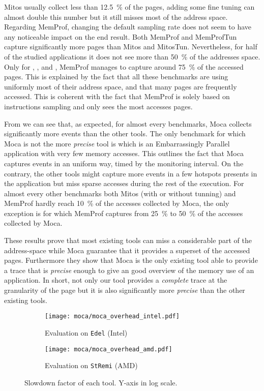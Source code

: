 \gls{Mitos} usually collect less than \SI{12.5}{\%} of the pages, adding some fine tuning can almost double this number but it still misses most of the address space.
Regarding \gls{MemProf}, changing the default sampling rate does not seem to have any noticeable impact on the end result.
Both \gls{MemProf} and MemProfTun capture significantly more pages than \gls{Mitos} and MitosTun.
Nevertheless, for half of the studied applications it does not see more than \SI{50}{\%} of the addresses space.
Only for \BT, \LU, \SP and \UA, \gls{MemProf} manages to capture around \SI{75}{\%} of the accessed pages.
This is explained by the fact that all these benchmarks are using uniformly most of their address space, and that many pages are frequently accessed.
This is coherent with the fact that \gls{MemProf} is solely based on instructions sampling and only sees the most accesses pages.

From  we can see that, as expected, for almost every benchmarks, \gls{Moca} collects significantly more events than the other tools.
 The only benchmark for which \gls{Moca} is not the more \emph{precise} tool is \EP which is an Embarrassingly Parallel application with very few memory accesses.
This outlines the fact that \gls{Moca} captures events in an uniform way, timed by the monitoring interval.
On the contrary, the other tools might capture more events in a few hotspots presents in the application but miss sparse accesses during the rest of the execution.
For almost every other benchmarks both \gls{Mitos} (with or without tunning) and \gls{MemProf} hardly reach \SI{10}{\%} of the accesses collected by \gls{Moca}, the only exception is \DC for which \gls{MemProf} captures from \SI{25}{\%} to \SI{50}{\%} of the accesses collected by \gls{Moca}.

These results prove that most existing tools can miss a considerable part of
the address-space while \gls{Moca} guarantee that it provides a superset of the accessed pages.
Furthermore they show that \gls{Moca} is the only existing tool able to provide a trace that is \emph{precise} enough to give an good overview of the memory use of an application.
In short, not only our tool provides a \emph{complete} trace at the granularity of the page but it is also significantly more \emph{precise} than the other existing tools.

\begin{figure}[htb]
    \centering
    \begin{subfigure}{.73\linewidth}
        \texttt{[image: moca/moca\_overhead\_intel.pdf]}
        \caption{Evaluation on \texttt{Edel} (Intel)}
        \label{fig:ovh-moca-Intel}
    \end{subfigure}
    \begin{subfigure}{.73\linewidth}
        \texttt{[image: moca/moca\_overhead\_amd.pdf]}
        \caption{Evaluation on \texttt{StRemi} (AMD)}
        \label{fig:ovh-moca-AMD}
    \end{subfigure}
    \caption[Slowdown factor of each tool.]{Slowdown factor of each tool.
    Y-axis in log scale.}
    \label{fig:ovh-moca}
\end{figure}


